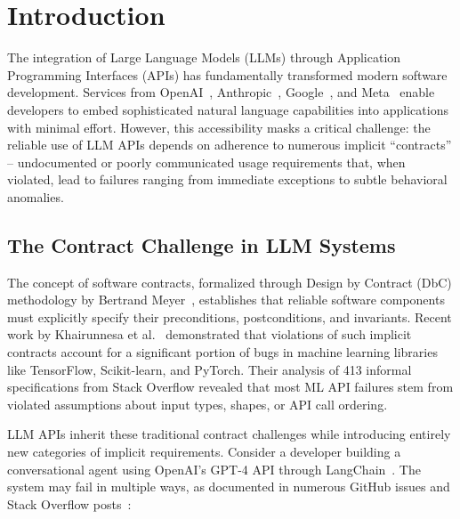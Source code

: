 \documentclass[11pt]{article}
\begin{document}
\section{Introduction}

The integration of Large Language Models (LLMs) through Application Programming Interfaces (APIs) has fundamentally transformed modern software development. Services from OpenAI~\cite{openai2023docs}, Anthropic~\cite{anthropic2023docs}, Google~\cite{google2023gemini}, and Meta~\cite{meta2023llama} enable developers to embed sophisticated natural language capabilities into applications with minimal effort. However, this accessibility masks a critical challenge: the reliable use of LLM APIs depends on adherence to numerous implicit ``contracts'' -- undocumented or poorly communicated usage requirements that, when violated, lead to failures ranging from immediate exceptions to subtle behavioral anomalies.

\subsection{The Contract Challenge in LLM Systems}

The concept of software contracts, formalized through Design by Contract (DbC) methodology by Bertrand Meyer~\cite{meyer1992applying, meyer1997object}, establishes that reliable software components must explicitly specify their preconditions, postconditions, and invariants. Recent work by Khairunnesa et al.~\cite{khairunnesa2023} demonstrated that violations of such implicit contracts account for a significant portion of bugs in machine learning libraries like TensorFlow, Scikit-learn, and PyTorch. Their analysis of 413 informal specifications from Stack Overflow revealed that most ML API failures stem from violated assumptions about input types, shapes, or API call ordering.

LLM APIs inherit these traditional contract challenges while introducing entirely new categories of implicit requirements. Consider a developer building a conversational agent using OpenAI's GPT-4 API through LangChain~\cite{langchain2023}. The system may fail in multiple ways, as documented in numerous GitHub issues and Stack Overflow posts~\cite{stackoverflow75396481, githublangchain11405}:
\end{document}
